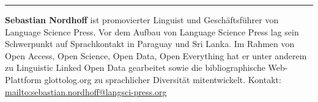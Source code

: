 \begin{center}\rule{0.5\linewidth}{\linethickness}\end{center}

\textbf{Sebastian Nordhoff} ist promovierter Linguist und
Geschäftsführer von Language Science Press. Vor dem Aufbau von Language
Science Press lag sein Schwerpunkt auf Sprachkontakt in Paraguay und Sri
Lanka. Im Rahmen von Open Access, Open Science, Open Data, Open
Everything hat er unter anderem zu Linguistic Linked Open Data
gearbeitet sowie die bibliographische Web-Plattform glottolog.org zu
sprachlicher Diversität mitentwickelt. Kontakt:
\url{mailto:sebastian.nordhoff@langsci-press.org}
